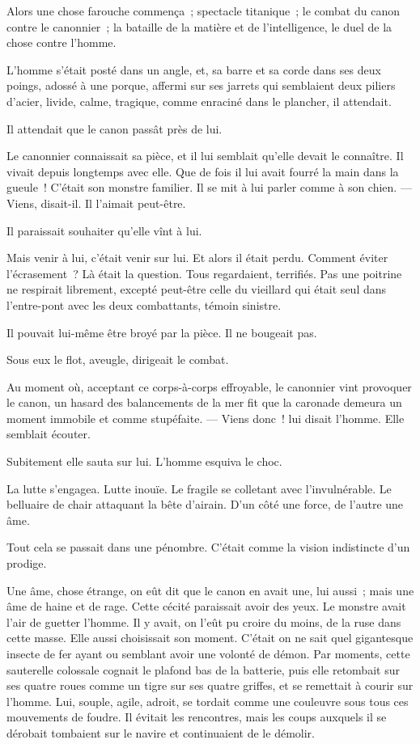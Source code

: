 \documentclass[french,twoside]{book} %
\begin{document}
Alors une chose farouche commença ; spectacle titanique ; le combat du canon contre le canonnier ; la bataille de la matière et de l’intelligence, le duel de la chose contre l’homme.\par
L’homme s’était posté dans un angle, et, sa barre et sa corde dans ses deux poings, adossé à une porque, affermi sur ses jarrets qui semblaient deux piliers d’acier, livide, calme, tragique, comme enraciné dans le plancher, il attendait.\par
Il attendait que le canon passât près de lui.\par
Le canonnier connaissait sa pièce, et il lui semblait qu’elle devait le connaître. Il vivait depuis longtemps avec elle. Que de fois il lui avait fourré la main dans la gueule ! C’était son monstre familier. Il se mit à lui parler comme à son chien. — Viens, disait-il. Il l’aimait peut-être.\par
Il paraissait souhaiter qu’elle vînt à lui.\par
Mais venir à lui, c’était venir sur lui. Et alors il était perdu. Comment éviter l’écrasement ? Là était la question. Tous regardaient, terrifiés. Pas une poitrine ne respirait librement, excepté peut-être celle du  vieillard qui était seul dans l’entre-pont avec les deux combattants, témoin sinistre.\par
Il pouvait lui-même être broyé par la pièce. Il ne bougeait pas.\par
Sous eux le flot, aveugle, dirigeait le combat.\par
Au moment où, acceptant ce corps-à-corps effroyable, le canonnier vint provoquer le canon, un hasard des balancements de la mer fit que la caronade demeura un moment immobile et comme stupéfaite. — Viens donc ! lui disait l’homme. Elle semblait écouter.\par
Subitement elle sauta sur lui. L’homme esquiva le choc.\par
La lutte s’engagea. Lutte inouïe. Le fragile se colletant avec l’invulnérable. Le belluaire de chair attaquant la bête d’airain. D’un côté une force, de l’autre une âme.\par
Tout cela se passait dans une pénombre. C’était comme la vision indistincte d’un prodige.\par
Une âme, chose étrange, on eût dit que le canon en avait une, lui aussi ; mais une âme de haine et de rage. Cette cécité paraissait avoir des yeux. Le monstre avait l’air de guetter l’homme. Il y avait, on l’eût pu croire du moins, de la ruse dans cette masse. Elle aussi choisissait son moment. C’était on ne sait quel gigantesque insecte de fer ayant ou semblant avoir une volonté de démon. Par moments, cette sauterelle colossale cognait le plafond bas de la batterie, puis elle retombait sur ses quatre roues comme un tigre sur ses quatre griffes, et se remettait à courir  sur l’homme. Lui, souple, agile, adroit, se tordait comme une couleuvre sous tous ces mouvements de foudre. Il évitait les rencontres, mais les coups auxquels il se dérobait tombaient sur le navire et continuaient de le démolir.\par
\end{document}
